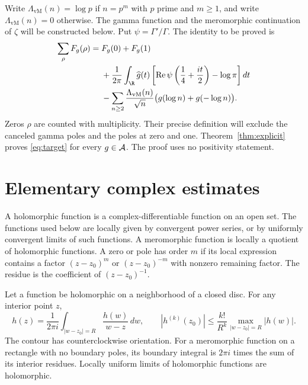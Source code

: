 Write $\Lambda_{\mathrm{vM}}(n)=\log p$ if $n=p^m$ with $p$ prime and $m\geq1$,
and write $\Lambda_{\mathrm{vM}}(n)=0$ otherwise.
The gamma function and the meromorphic continuation of $\zeta$ will be
constructed below.  Put $\psi=\Gamma'/\Gamma$.
The identity to be proved is
\begin{equation}
\begin{split}
 \sum_\rho F_g(\rho)={}&F_g(0)+F_g(1)\\
 &+\frac1{2\pi}\int_{\R}\widehat g(t)
 \left[\operatorname{Re}\psi\left(\frac14+\frac{it}{2}\right)-\log\pi\right]dt\\
 &-\sum_{n\geq2}\frac{\Lambda_{\mathrm{vM}}(n)}{\sqrt n}
                      \bigl(g(\log n)+g(-\log n)\bigr).
\end{split}
\label{eq:target}
\end{equation}
Zeros $\rho$ are counted with multiplicity.  Their precise definition will
exclude the canceled gamma poles and the poles at zero and one.
Theorem~\ref{thm:explicit} proves \eqref{eq:target} for every $g\in\mathcal A$.
The proof uses no positivity statement.

\section{Elementary complex estimates}
\label{sec:complex}

A holomorphic function is a complex-differentiable function on an open set.
The functions used below are locally given by convergent power series,
or by uniformly convergent limits of such functions.
A meromorphic function is locally a quotient of holomorphic functions.
A zero or pole has order $m$ if its local expression contains a factor
$(z-z_0)^m$ or $(z-z_0)^{-m}$ with nonzero remaining factor.
The residue is the coefficient of $(z-z_0)^{-1}$.

\begin{lemma}
\label{lem:cauchy}
Let a function be holomorphic on a neighborhood of a closed disc.
For any interior point $z$,
\[
 h(z)=\frac1{2\pi i}\int_{|w-z_0|=R}\frac{h(w)}{w-z}\,dw,
 \qquad
 |h^{(k)}(z_0)|\leq \frac{k!}{R^k}\max_{|w-z_0|=R}|h(w)|.
\]
The contour has counterclockwise orientation.
For a meromorphic function on a rectangle with no boundary poles, its
boundary integral is $2\pi i$ times the sum of its interior residues.
Locally uniform limits of holomorphic functions are holomorphic.
\end{lemma}

